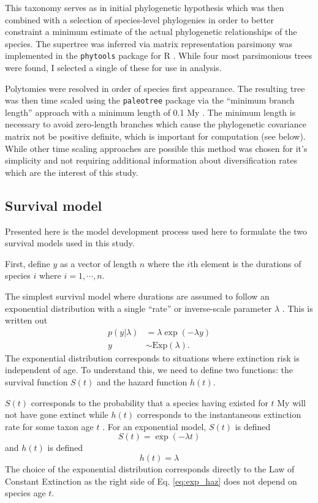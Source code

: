 \documentclass{article}
\begin{document}
This taxonomy serves as in initial phylogenetic hypothesis which was then combined with a selection of species-level phylogenies \cite{Bininda-Emonds2007,Raia2012f} in order to better constraint a minimum estimate of the actual phylogenetic relationships of the species. The supertree was inferred via matrix representation parsimony was implemented in the \texttt{phytools} package for R \cite{revell2012phytools}. While four most parsimonious trees were found, I selected a single of these for use in analysis.

Polytomies were resolved in order of species first appearance. The resulting tree was then time scaled using the \texttt{paleotree} package via the ``minimum branch length'' approach with a minimum length of 0.1 My \cite{Bapst2012a}. The minimum length is necessary to avoid zero-length branches which cause the phylogenetic covariance matrix not be positive definite, which is important for computation (see below). While other time scaling approaches are possible \cite{Bapst2013a,Hedman2010} this method was chosen for it's simplicity and not requiring additional information about diversification rates which are the interest of this study. 


\subsection{Survival model}
Presented here is the model development process used here to formulate the two survival models used in this study. 

First, define \(y\) as a vector of length \(n\) where the \(i\)th element is the durations of species \(i\) where \(i = 1,\cdots,n\).

The simplest survival model where durations are assumed to follow an exponential distribution with a single ``rate'' or inverse-scale parameter \(\lambda\) \cite{Klein2003}. This is written out
\begin{align}
  p(y | \lambda) &= \lambda \exp(-\lambda y) \nonumber \\
  y &\sim \mathrm{Exp}(\lambda).
  \label{eq:exp}
\end{align}
The exponential distribution corresponds to situations where extinction risk is independent of age. To understand this, we need to define two functions: the survival function \(S(t)\) and the hazard function \(h(t)\). 

\(S(t)\) corresponds to the probability that a species having existed for \(t\) My will not have gone extinct while \(h(t)\) corresponds to the instantaneous extinction rate for some taxon age \(t\) \cite{Klein2003}. For an exponential model, \(S(t)\) is defined
\begin{equation}
  S(t) = \exp(-\lambda t)
  \label{eq:exp_surv}
\end{equation}
and \(h(t)\) is defined
\begin{equation}
  h(t) = \lambda
  \label{eq:exp_haz}
\end{equation}
The choice of the exponential distribution corresponds directly to the Law of Constant Extinction \cite{VanValen1973} as the right side of Eq. \ref{eq:exp_haz} does not depend on species age \(t\). 
\end{document}
